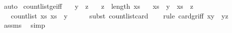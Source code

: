 \begin{isabellebody}
\ auto%
\endisatagproof
{\isafoldproof}%
%
\isadelimproof
\isanewline
%
\endisadelimproof
\isanewline
{}\isamarkupfalse%
\ count{\isacharunderscore}{\kern0pt}list{\isacharunderscore}{\kern0pt}ge{\isacharunderscore}{\kern0pt}{}{\isacharunderscore}{\kern0pt}iff{\isacharcolon}{\kern0pt}\isanewline
\ \ \ {\isachardoublequoteopen}y\ {\isacharless}{\kern0pt}\ z{\isachardoublequoteclose}\isanewline
\ \ \ {\isachardoublequoteopen}z\ {\isacharless}{\kern0pt}\ length\ xs{\isachardoublequoteclose}\isanewline
\ \ \ {\isachardoublequoteopen}xs\ {\isacharbang}{\kern0pt}\ y\ {\isacharequal}{\kern0pt}\ xs\ {\isacharbang}{\kern0pt}\ z{\isachardoublequoteclose}\isanewline
\ \ \ {\isachardoublequoteopen}count{\isacharunderscore}{\kern0pt}list\ xs\ {\isacharparenleft}{\kern0pt}xs\ {\isacharbang}{\kern0pt}\ y{\isacharparenright}{\kern0pt}\ {\isachargreater}{\kern0pt}\ {}{\isachardoublequoteclose}\isanewline
%
\isadelimproof
\ \ %
\endisadelimproof
%
\isatagproof
{}\isamarkupfalse%
\ {\isacharparenleft}{\kern0pt}subst\ count{\isacharunderscore}{\kern0pt}list{\isacharunderscore}{\kern0pt}card{\isacharparenright}{\kern0pt}\isanewline
\ \ \isamarkupfalse%
\ {\isacharparenleft}{\kern0pt}rule\ card{\isacharunderscore}{\kern0pt}gr{\isacharunderscore}{\kern0pt}{}{\isacharunderscore}{\kern0pt}iff{\isacharbrackleft}{\kern0pt}\ x{\isacharequal}{\kern0pt}{\isachardoublequoteopen}y{\isachardoublequoteclose}\ \ y{\isacharequal}{\kern0pt}{\isachardoublequoteopen}z{\isachardoublequoteclose}{\isacharbrackright}{\kern0pt}{\isacharparenright}{\kern0pt}\isanewline
\ \ \isamarkupfalse%
\ assms\ \isamarkupfalse%
\ simp{\isacharplus}{\kern0pt}%
\endisatagproof
{\isafoldproof}%
%
\isadelimproof
\isanewline
%
\endisadelimproof
%
\isadelimtheory
\isanewline
%
\endisadelimtheory
%
\isatagtheory
{}\isamarkupfalse%
%
\endisatagtheory
{\isafoldtheory}%
%
\isadelimtheory
%
\endisadelimtheory
%
\end{isabellebody}%
\endinput
